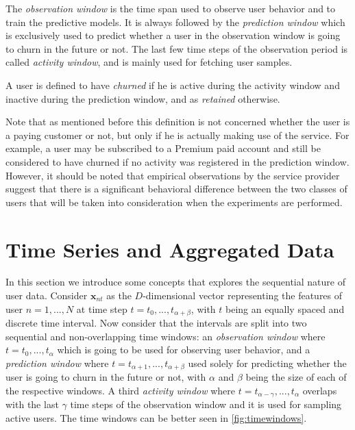 \documentclass{kththesis}
\begin{document}
\begin{definition}
The \emph{observation window} is the time span used to observe user behavior and to train the predictive models. It is always followed by the \emph{prediction window} which is exclusively used to predict whether a user in the observation window is going to churn in the future or not. The last few time steps of the observation period is called \emph{activity window}, and is mainly used for fetching user samples.
\end{definition}

\begin{definition}
\label{def:churn}
A user is defined to have \emph{churned} if he is active during the activity window and inactive during the prediction window, and as \emph{retained} otherwise.
\end{definition}

Note that as mentioned before this definition is not concerned whether the user is a paying customer or not, but only if he is actually making use of the service. For example, a user may be subscribed to a Premium paid account and still be considered to have churned if no activity was registered in the prediction window. However, it should be noted that empirical observations by the service provider suggest that there is a significant behavioral difference between the two classes of users that will be taken into consideration when the experiments are performed. 

\section{Time Series and Aggregated Data}
\label{sec:timewindows}

In this section we introduce some concepts that explores the sequential nature of user data. Consider $\mathbf{x}_{nt}$ as the $D$-dimensional vector representing the features of user $n=1,...,N$ at time step $t = t_0,...,t_{\alpha+\beta}$, with $t$ being an equally spaced and discrete time interval. Now consider that the intervals are split into two sequential and non-overlapping time windows: an \emph{observation window} where $t = t_0,...,t_\alpha$ which is going to be used for observing user behavior, and a \emph{prediction window} where $t = t_{\alpha+1},...,t_{\alpha+\beta}$ used solely for predicting whether the user is going to churn in the future or not, with $\alpha$ and $\beta$ being the size of each of the respective windows. A third \emph{activity window} where $t=t_{\alpha-\gamma},...,t_\alpha$ overlaps with the last $\gamma$ time steps of the observation window and it is used for sampling active users. The time windows can be better seen in \autoref{fig:timewindows}.
\end{document}
